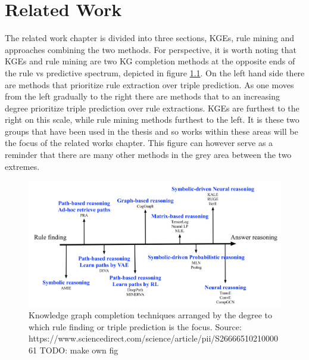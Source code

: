 \chapter{Related Work}
The related work chapter is divided into three sections, KGEs, rule mining and approaches combining the two methods. For perspective, it is worth noting that KGEs and rule mining are two KG completion methods at the opposite ends of the rule vs predictive spectrum, depicted in figure \ref{scale}. On the left hand side there are methods that prioritize rule extraction over triple prediction. As one moves from the left gradually to the right there are methods that to an increasing degree prioritize triple prediction over rule extractions. KGEs are furthest to the right on this scale, while rule mining methods furthest to the left. It is these two groups that have been used in the thesis and so works within these areas will be the focus of the related works chapter. This figure can however serve as a reminder that there are many other methods in the grey area between the two extremes. 

\begin{figure}[htbp]
\centering
\includegraphics[width=1\linewidth]{figures/related_works/Screenshot.png}
\caption{Knowledge graph completion techniques arranged by the degree to which rule finding or triple prediction is the focus. Source:  https://www.sciencedirect.com/science/article/pii/S2666651021000061   TODO: make own fig}
\label{scale}
\end{figure}

